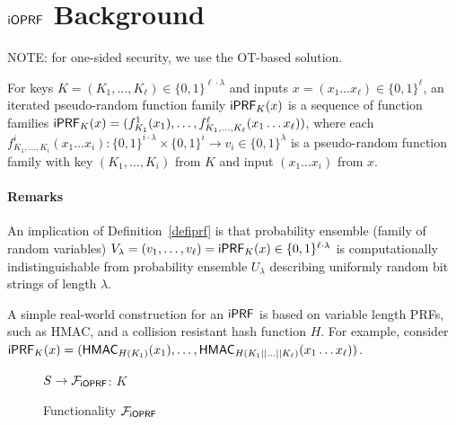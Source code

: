\section{$\mathsf{i}\mathsf{OPRF}$ Background}
NOTE: for one-sided security, we use the OT-based solution.


\begin{definition}[$\iprf$]\label{defiprf}
  For keys $K=(K_1,\ldots,K_\ell)\in\{0,1\}^{\ell\cdot\lambda}$ and
  inputs $x=(x_1\ldots{}x_\ell)\in\{0,1\}^\ell$, an iterated
  pseudo-random function family $\mathsf{i}\mathsf{PRF}_{K}(x)$ is a sequence of
  function families
  $\mathsf{i}\mathsf{PRF}_K(x)=(f^1_{K_1}(x_{1}),\ldots,f^\ell_{K_1,\ldots,K_\ell}(x_{1}\ldots{}x_{\ell}))$,
  where each
  $f^i_{K_1,\ldots,K_i}(x_{1}\ldots{}x_{i}):\{0,1\}^{i\cdot\lambda}\times\{0,1\}^{i}\rightarrow{}v_i\in\{0,1\}^\lambda$
  is a pseudo-random function family with key $(K_1,\ldots,K_i)$ from $K$ and
  input $(x_1\ldots{}x_i)$ from $x$.
\end{definition}

\paragraph{Remarks}
An implication of Definition~\ref{defiprf} is that probability
ensemble (family of random variables)
$V_\lambda=(v_1,\ldots,v_\ell)=\mathsf{i}\mathsf{PRF}_K(x)\in\{0,1\}^{\ell\cdot\lambda}$
is computationally indistinguishable from probability ensemble
$U_\lambda$ describing uniformly random bit strings of length
$\lambda$.

A simple real-world construction for an $\iprf$ is based on variable
length PRFs, such as HMAC, and a collision resistant hash function
$H$. For example, consider
$\mathsf{i}\mathsf{PRF}_K(x)=(\mathsf{HMAC}_{H(K_1)}(x_1),\ldots,\mathsf{HMAC}_{H(K_1||\ldots||K_\ell)}(x_1\ldots{}x_\ell))$.


\begin{figure}[tb]
\LinesNumbered
\begin{functionality}[H]
  $S\rightarrow{}\mathcal{F}_{\mathsf{i}\mathsf{OPRF}}$: $K$\; 
\end{functionality}
\caption{Functionality $\mathcal{F}_{\mathsf{i}\mathsf{OPRF}}$\label{idealioprf}}
\end{figure}

